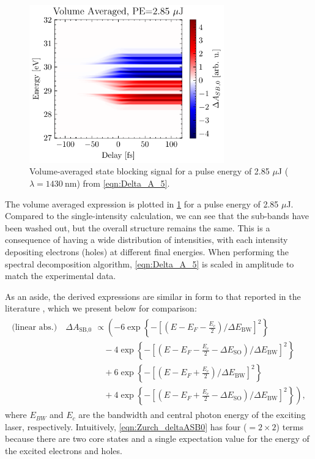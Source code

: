 \begin{figure}
	\centering
	\includegraphics[width=0.75\textwidth]{figures/chap4/dASB0_1430nm_2p85uJ.pdf}
	\caption{Volume-averaged state blocking signal for a pulse energy of 2.85 $\mu$J ($\lambda=1430 \ \textrm{nm}$) from \cref{eqn:Delta_A_5}.}
	\label{fig:dASB0_1430nm_2p85uJ}
\end{figure}

The volume averaged expression is plotted in \cref{fig:dASB0_1430nm_2p85uJ} for a pulse energy of 2.85 $\mu$J. Compared to the single-intensity calculation, we can see that the sub-bands have been washed out, but the overall structure remains the same. This is a consequence of having a wide distribution of intensities, with each intensity depositing electrons (holes) at different final energies. When performing the spectral decomposition algorithm, \cref{eqn:Delta_A_5} is scaled in amplitude to match the experimental data.

As an aside, the derived expressions are similar in form to that reported in the literature \cite{zurchDirectSimultaneousObservation2017}, which we present below for comparison:
\begin{align}
\label{eqn:Zurch_deltaASB0}
\begin{split}
\textrm{(linear abs.)} \quad \Delta A_{\textrm{SB,0}} &\propto \left( -6 \exp \left\{- \left[ \left(E-E_F-\frac{E_c}{2} \right)/\Delta E_{\textrm{BW}} \right]^2 \right\} \right. \\
	&\quad - 4 \exp \left\{- \left[ \left(E-E_F-\frac{E_c}{2}-\Delta E_{\textrm{SO}} \right)/\Delta E_{\textrm{BW}} \right]^2 \right\} \\
	&\quad + 6 \exp \left\{- \left[ \left(E-E_F+\frac{E_c}{2} \right)/\Delta E_{\textrm{BW}} \right]^2 \right\} \\
	&\left. \quad + 4 \exp \left\{- \left[ \left(E-E_F+\frac{E_c}{2}-\Delta E_{\textrm{SO}} \right)/\Delta E_{\textrm{BW}} \right]^2 \right\} \right),
\end{split}
\end{align}
where $E_{BW}$ and $E_c$ are the bandwidth and central photon energy of the exciting laser, respectively. Intuitively, \cref{eqn:Zurch_deltaASB0} has four ($=2 \times 2$) terms because there are two core states and a single expectation value for the energy of the excited electrons and holes. 

